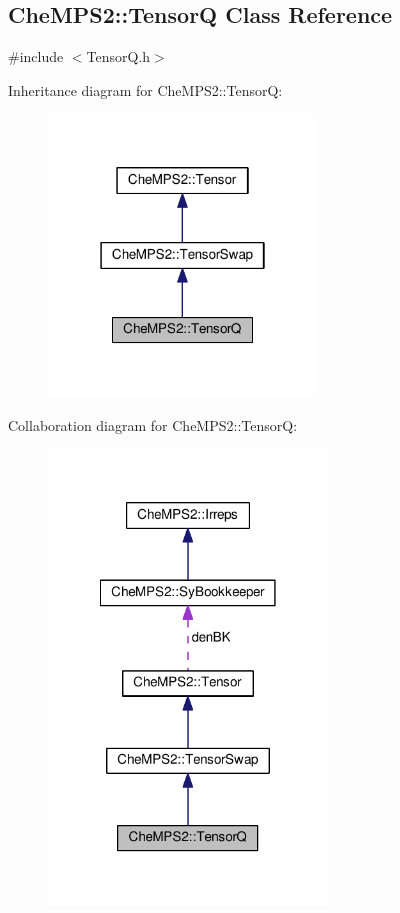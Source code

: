 \hypertarget{classCheMPS2_1_1TensorQ}{\subsection{Che\-M\-P\-S2\-:\-:Tensor\-Q Class Reference}
\label{classCheMPS2_1_1TensorQ}
}


{\ttfamily \#include $<$Tensor\-Q.\-h$>$}



Inheritance diagram for Che\-M\-P\-S2\-:\-:Tensor\-Q\-:\nopagebreak
\begin{figure}[H]
\begin{center}
\leavevmode
\includegraphics[width=202pt]{classCheMPS2_1_1TensorQ__inherit__graph}
\end{center}
\end{figure}


Collaboration diagram for Che\-M\-P\-S2\-:\-:Tensor\-Q\-:\nopagebreak
\begin{figure}[H]
\begin{center}
\leavevmode
\includegraphics[width=210pt]{classCheMPS2_1_1TensorQ__coll__graph}
\end{center}
\end{figure}
